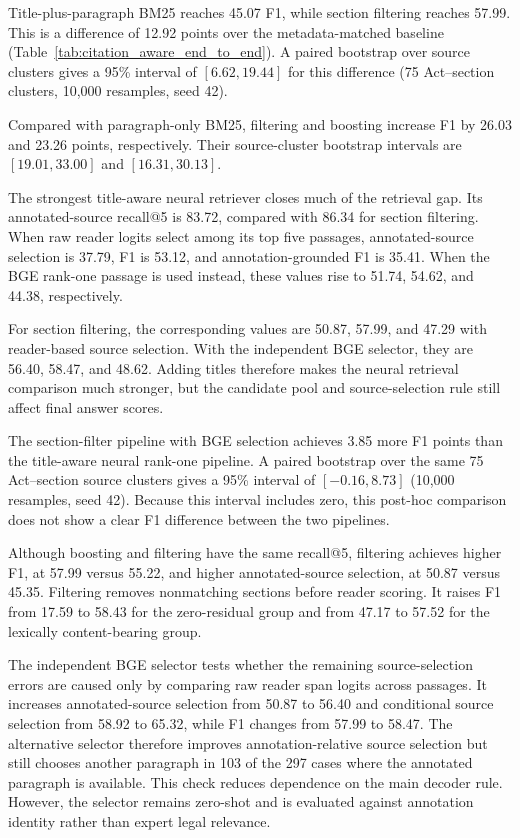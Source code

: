 \documentclass[pdflatex,sn-basic]{sn-jnl}%
\theoremstyle{thmstyleone}%
\theoremstyle{thmstyletwo}%
\theoremstyle{thmstylethree}%
\begin{document}
Title-plus-paragraph BM25 reaches 45.07 F1, while section filtering reaches
57.99. This is a difference of 12.92 points over the metadata-matched
baseline (Table~\ref{tab:citation_aware_end_to_end}). A paired bootstrap over
source clusters gives a 95\% interval of $[6.62,19.44]$ for this difference
(75 Act--section clusters, 10,000 resamples, seed 42).

Compared with paragraph-only BM25, filtering and boosting increase F1 by
26.03 and 23.26 points, respectively. Their source-cluster bootstrap
intervals are $[19.01,33.00]$ and $[16.31,30.13]$.

The strongest title-aware neural retriever closes much of the retrieval gap.
Its annotated-source recall@5 is 83.72, compared with 86.34 for section
filtering. When raw reader logits select among its top five passages,
annotated-source selection is 37.79, F1 is 53.12, and annotation-grounded F1
is 35.41. When the BGE rank-one passage is used instead, these values rise
to 51.74, 54.62, and 44.38, respectively.

For section filtering, the corresponding values are 50.87, 57.99, and 47.29
with reader-based source selection. With the independent BGE selector, they
are 56.40, 58.47, and 48.62. Adding titles therefore makes the neural
retrieval comparison much stronger, but the candidate pool and
source-selection rule still affect final answer scores.

The section-filter pipeline with BGE selection achieves 3.85 more F1 points
than the title-aware neural rank-one pipeline. A paired bootstrap over the
same 75 Act--section source clusters gives a 95\% interval of
$[-0.16,8.73]$ (10,000 resamples, seed 42). Because this interval includes
zero, this post-hoc comparison does not show a clear F1 difference between
the two pipelines.

Although boosting and filtering have the same recall@5, filtering achieves
higher F1, at 57.99 versus 55.22, and higher annotated-source selection, at
50.87 versus 45.35. Filtering removes nonmatching sections before reader
scoring. It raises F1 from 17.59 to 58.43 for the zero-residual group and
from 47.17 to 57.52 for the lexically content-bearing group.

The independent BGE selector tests whether the remaining source-selection
errors are caused only by comparing raw reader span logits across passages.
It increases annotated-source selection from 50.87 to 56.40 and conditional
source selection from 58.92 to 65.32, while F1 changes from 57.99 to 58.47.
The alternative selector therefore improves annotation-relative source
selection but still chooses another paragraph in 103 of the 297 cases where
the annotated paragraph is available. This check reduces dependence on the
main decoder rule. However, the selector remains zero-shot and is evaluated
against annotation identity rather than expert legal relevance.
\end{document}
